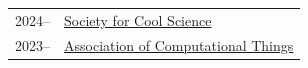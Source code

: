 
\begin{longtable}[l]{@{}p{} p{}@{}}

    2024-- & \href{https://example.com/}{Society for Cool Science} \\

    2023-- & \href{https://example.com/}{Association of Computational Things} \\

\end{longtable}
